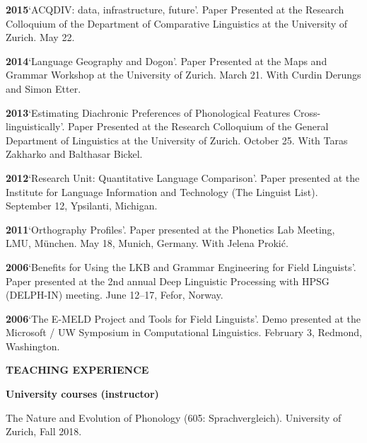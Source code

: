\documentclass[11pt]{article}
\newcommand{\hangpara}{
 \setlength{\parindent}{0in} %
 \hangindent=0.42in %
}
\begin{document}
\vskip 6pt
\hangpara
{\bf 2015}\hspace{1ex}`ACQDIV: data, infrastructure, future'. Paper Presented at the Research Colloquium of the Department of Comparative Linguistics at the University of Zurich. May 22.

\vskip 6pt
\hangpara
{\bf 2014}\hspace{1ex}`Language Geography and Dogon'. Paper Presented at the Maps and Grammar Workshop at the University of Zurich. March 21. With Curdin Derungs and Simon Etter.

\vskip 6pt
\hangpara
{\bf 2013}\hspace{1ex}`Estimating Diachronic Preferences of Phonological Features Cross-linguistically'. Paper Presented at the Research Colloquium of the General Department of Linguistics at the University of Zurich. October 25. With Taras Zakharko and Balthasar Bickel.

\vskip 6pt
\hangpara
{\bf 2012}\hspace{1ex}`Research Unit: Quantitative Language Comparison'. Paper presented at the Institute for Language Information and Technology (The Linguist List). September 12, Ypsilanti, Michigan.

\vskip 6pt
\hangpara
{\bf 2011}\hspace{1ex}`Orthography Profiles'. Paper presented at the Phonetics Lab Meeting, LMU, M{\"u}nchen. May 18, Munich, Germany. With Jelena Proki{\'c}.

\vskip 6pt
\hangpara
{\bf 2006}\hspace{1ex}`Benefits for Using the LKB and Grammar Engineering for Field Linguists'. Paper presented at the 2nd annual Deep Linguistic Processing with HPSG (DELPH-IN) meeting. June 12--17, Fefor, Norway.

\vskip 6pt
\hangpara
{\bf 2006}\hspace{1ex}`The E-MELD Project and Tools for Field Linguists'. Demo presented at the Microsoft / UW Symposium in Computational Linguistics. February 3, Redmond, Washington.


\vskip 20pt
\begin{flushleft}
{\bf TEACHING EXPERIENCE}
\end{flushleft}

\begin{flushleft}
{\bf University courses (instructor)}
\end{flushleft}


\hangpara The Nature and Evolution of Phonology (605: Sprachvergleich). University of Zurich, Fall 2018.
\end{document}
